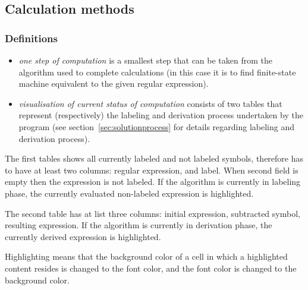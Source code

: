 \documentclass{article}
\begin{document}
\subsection{Calculation methods}

\subsubsection*{Definitions}
\begin{itemize}%

  \item \textit{one step of computation} is a smallest step that can be taken from the algorithm
  used to complete calculations (in this case it is to find finite-state machine equivalent to the
  given regular expression).

  \item \textit{visualisation of current status of computation} consists of two tables that
  represent (respectively) the labeling and derivation process undertaken by the program (see
  section~\ref{sec:solutionprocess} for details regarding labeling and derivation process).

\end{itemize}

The first tables shows all currently labeled and not labeled symbols, therefore has to have at least
two columns: regular expression, and label. When second field is empty then the expression is not
labeled. If the algorithm is currently in labeling phase, the currently evaluated non-labeled
expression is highlighted.

The second table has at list three columns: initial expression, subtracted symbol, resulting
expression. If the algorithm is currently in derivation phase, the currently derived expression is
highlighted.

Highlighting means that the background color of a cell in which a highlighted content resides is
changed to the font color, and the font color is changed to the background color.
\end{document}
